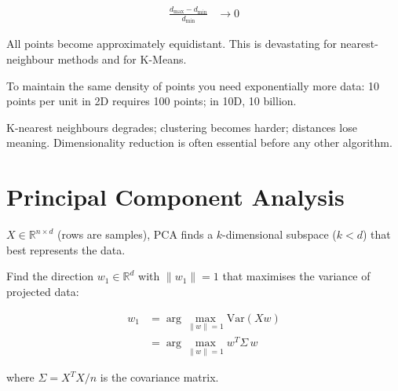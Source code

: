 \begin{align*}
    \frac{d_{\max} - d_{\min}}{d_{\min}} &\to 0
\end{align*}

All points become approximately equidistant.
This is devastating for nearest-neighbour methods and for K-Means.

To maintain the same density of points you need exponentially more data: 10 points per unit in 2D requires 100 points; in 10D, 10 billion.


 K-nearest neighbours degrades; clustering becomes harder; distances lose meaning.
Dimensionality reduction is often essential before any other algorithm.


\section{Principal Component Analysis}


 $X \in \mathbb{R}^{n \times d}$ (rows are samples), PCA finds a $k$-dimensional subspace ($k < d$) that best represents the data.

Find the direction $w_1 \in \mathbb{R}^d$ with $\|w_1\|{=}1$ that maximises the variance of projected data:

\begin{align*}
    w_1 &= \arg\max_{\|w\|=1} \text{Var}(Xw) \\
        &= \arg\max_{\|w\|=1} w^T \Sigma\, w
\end{align*}

where $\Sigma = X^T X / n$ is the covariance matrix.


